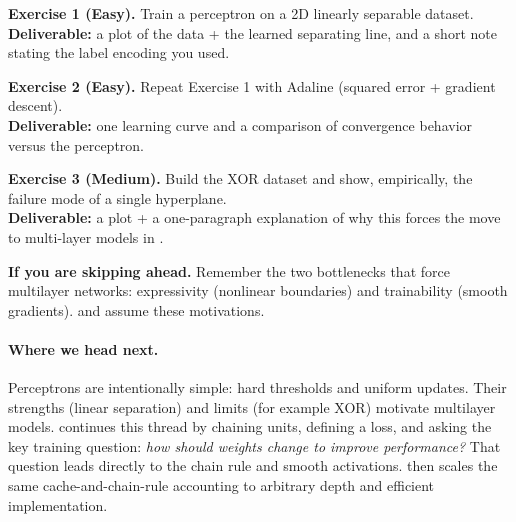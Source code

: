 \begin{tcolorbox}[summarybox, title={Exercises}]
\textbf{Exercise 1 (Easy).} Train a perceptron on a 2D linearly separable dataset. \\
\textbf{Deliverable:} a plot of the data + the learned separating line, and a short note stating the label encoding you used.

\smallskip
\textbf{Exercise 2 (Easy).} Repeat Exercise 1 with Adaline (squared error + gradient descent). \\
\textbf{Deliverable:} one learning curve and a comparison of convergence behavior versus the perceptron.

\smallskip
\textbf{Exercise 3 (Medium).} Build the XOR dataset and show, empirically, the failure mode of a single hyperplane. \\
\textbf{Deliverable:} a plot + a one-paragraph explanation of why this forces the move to multi-layer models in .
\par\medskip
\noindent\textbf{If you are skipping ahead.} Remember the two bottlenecks that force multilayer networks: expressivity (nonlinear boundaries) and trainability (smooth gradients).  and  assume these motivations.
\end{tcolorbox}

\medskip
\paragraph{Where we head next.} Perceptrons are intentionally simple: hard thresholds and uniform updates. Their strengths (linear separation) and limits (for example XOR) motivate multilayer models.  continues this thread by chaining units, defining a loss, and asking the key training question: \emph{how should weights change to improve performance?} That question leads directly to the chain rule and smooth activations.  then scales the same cache-and-chain-rule accounting to arbitrary depth and efficient implementation.

\nocite{McCullochPitts1943, Rosenblatt1958, WidrowHoff1960, Rumelhart1986}
